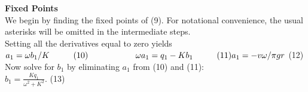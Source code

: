 \documentclass{article}
\newcommand\tab[1][1cm]{\hspace*{#1}}
\begin{document}
\textbf {Fixed Points} \\ \tab
We begin by finding the fixed points of (9). For notational convenience, the usual asterisks will be omitted in the intermediate steps. \\ \tab \tab
Setting all the derivatives equal to zero yields \\ \tab \tab
$a_{1}=\omega b_{1}/K \tab (10) \\
\tab \tab
\omega a_{1}=q_{1}-Kb_{1} \tab (11) \\
a_{1}=-v\omega / \pi gr$ \tab (12) \\

Now solve for $b_{1}$ by eliminating $a_{1}$ from (10) and (11): \\ \tab \tab
$b_{1}=\frac{Kq_{1}}{\omega^{2}+K^{2}}.$ \tab (13) \\
\end{document}
